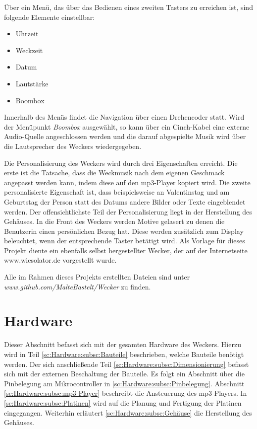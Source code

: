 \documentclass[journal, a4paper]{IEEEtran}
\begin{document}
	Über ein Menü, das über das Bedienen eines zweiten Tasters zu erreichen ist, sind folgende Elemente einstellbar:
	\begin{itemize}[leftmargin=20mm]
	\item Uhrzeit
	\item Weckzeit
	\item Datum
	\item Lautstärke
	\item Boombox
	\end{itemize}
	Innerhalb des Menüs findet die Navigation über einen Drehencoder statt. Wird der Menüpunkt \textit{Boombox} ausgewählt, so kann über ein Cinch-Kabel eine externe Audio-Quelle angeschlossen werden und die darauf abgespielte Musik wird über die Lautsprecher des Weckers wiedergegeben.\par
	Die Personalisierung des Weckers wird durch drei Eigenschaften erreicht. Die erste ist die Tatsache, dass die Weckmusik nach dem eigenen Geschmack angepasst werden kann, indem diese auf den mp3-Player kopiert wird. Die zweite personalisierte Eigenschaft ist, dass beispielsweise an Valentinstag und am Geburtstag der Person statt des Datums andere Bilder oder Texte eingeblendet werden. Der offensichtlichste Teil der Personalisierung liegt in der Herstellung des Gehäuses. In die Front des Weckers werden Motive gelasert zu denen die Benutzerin einen persönlichen Bezug hat. Diese werden zusätzlich zum Display beleuchtet, wenn der entsprechende Taster betätigt wird.
	Als Vorlage für dieses Projekt diente ein ebenfalls selbst hergestellter Wecker, der auf der Internetseite www.wiesolator.de vorgestellt wurde.\par
	Alle im Rahmen dieses Projekts erstellten Dateien sind unter \emph{www.github.com/MalteBastelt/Wecker} zu finden.
	
\section{Hardware}
	Dieser Abschnitt befasst sich mit der gesamten Hardware des Weckers. Hierzu wird in Teil \ref{sc:Hardware:subsc:Bauteile} beschrieben, welche Bauteile benötigt werden. Der sich anschließende Teil \ref{sc:Hardware:subsc:Dimensionierung} befasst sich mit der externen Beschaltung der Bauteile. Es folgt ein Abschnitt über die Pinbelegung am Mikrocontroller in \ref{sc:Hardware:subsc:Pinbelegung}. Abschnitt \ref{sc:Hardware:subsc:mp3-Player} beschreibt die Ansteuerung des mp3-Players. In \ref{sc:Hardware:subsc:Platinen} wird auf die Planung und Fertigung der Platinen eingegangen. Weiterhin erläutert \ref{sc:Hardware:subsc:Gehäuse} die Herstellung des Gehäuses.
	
\end{document}
